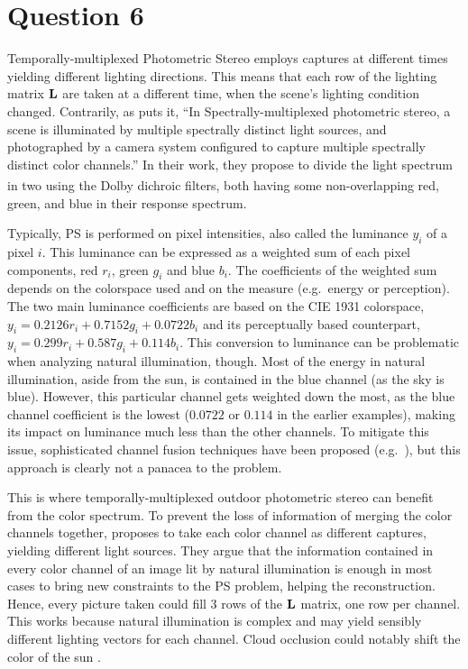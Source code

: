 \documentclass{report}
\begin{document}
\section{Question 6}

Temporally-multiplexed Photometric Stereo employs captures at different times yielding different lighting directions. This means that each row of the lighting matrix $\mathbf{L}$ are taken at a different time, when the scene's lighting condition changed. Contrarily, as \cite{Fyffe2011} puts it, ``In Spectrally-multiplexed photometric stereo, a scene is illuminated by multiple spectrally distinct light sources, and photographed by a camera system configured to capture multiple spectrally distinct color channels.'' In their work, they propose to divide the light spectrum in two using the Dolby\textsuperscript{\textregistered} dichroic filters, both having some non-overlapping red, green, and blue in their response spectrum.

Typically, PS is performed on pixel intensities, also called the luminance $y_i$ of a pixel $i$. This luminance can be expressed as a weighted sum of each pixel components, red $r_i$, green $g_i$ and blue $b_i$. The coefficients of the weighted sum depends on the colorspace used and on the measure (e.g.\ energy or perception). The two main luminance coefficients are based on the CIE 1931 colorspace, $y_i = 0.2126r_i + 0.7152g_i + 0.0722b_i$ and its perceptually based counterpart, $y_i = 0.299r_i + 0.587g_i + 0.114b_i$. This conversion to luminance can be problematic when analyzing natural illumination, though. Most of the energy in natural illumination, aside from the sun, is contained in the blue channel (as the sky is blue). However, this particular channel gets weighted down the most, as the blue channel coefficient is the lowest ($0.0722$ or $0.114$ in the earlier examples), making its impact on luminance much less than the other channels. To mitigate this issue, sophisticated channel fusion techniques have been proposed (e.g.\ \cite{jung-cvpr-15}), but this approach is clearly not a panacea to the problem.

This is where temporally-multiplexed outdoor photometric stereo can benefit from the color spectrum. To prevent the loss of information of merging the color channels together, \cite{johnson-cvpr-11} proposes to take each color channel as different captures, yielding different light sources. They argue that the information contained in every color channel of an image lit by natural illumination is enough in most cases to bring new constraints to the PS problem, helping the reconstruction. Hence, every picture taken could fill 3 rows of the $\mathbf{L}$ matrix, one row per channel. This works because natural illumination is complex and may yield sensibly different lighting vectors for each channel. Cloud occlusion could notably shift the color of the sun .
\end{document}
